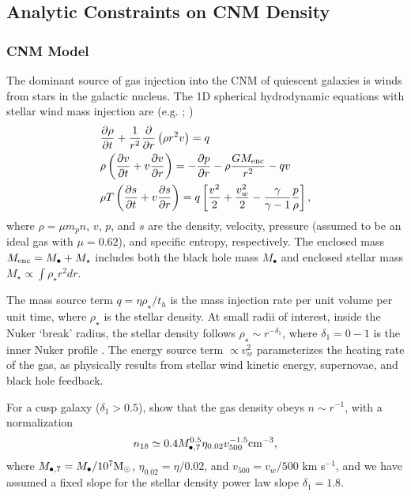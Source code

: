 \documentclass[usenatbib,fleqn]{mnras}
\newcommand{\Mbh}[1][]{M_{\bullet#1}}
\newcommand{\Menc}{M_{\rm enc}}
\renewcommand{\th}{t_h}
\newcommand{\Msun}{{\rm M_\odot}}
\begin{document}
\subsection{Analytic Constraints on CNM Density}

\subsubsection{CNM Model}

The dominant source of gas injection into the CNM of quiescent
galaxies is winds from stars in the galactic nucleus. The 1D spherical
hydrodynamic equations with stellar wind mass injection are
(e.g. \citealt{Holzer+1970}; \citealt{Quataert04}) 
\begin{align}
  &\frac{\partial \rho}{\partial t}+\frac{1}{r^2}\frac{\partial}{\partial r}\left(\rho r^2 v\right)=q \label{eq:drhodt}\\
  &\rho \left(\frac{\partial v}{\partial t} + v\frac{\partial
      v}{\partial r}\right) =-\frac{\partial p}{\partial r}- \rho\frac{GM_{\rm enc}}{r^{2}} -q v \label{eq:dvdt}\\
  &\rho T\left(\frac{\partial s}{\partial t} + v\frac{\partial
      s}{\partial
      r}\right)=q\left[\frac{v^2}{2}+\frac{v_w^2}{2}-\frac{\gamma}{\gamma-1}
    \frac{p}{\rho} \right] ,
\label{eq:dsdt}
\end{align}
where $\rho = \mu m_p n$, $v$, $p$, and $s$ are the density, velocity, pressure (assumed to be an ideal gas with $\mu = 0.62$), and
specific entropy, respectively.  The enclosed mass $\Menc = M_{\bullet} + M_{\star}$ includes both the black hole mass $M_{\bullet}$ and enclosed stellar mass $M_{\star} \propto \int \rho_{\star}r^{2}dr$.  

The mass source term $q =\eta \rho_\star/\th$ is the mass injection
rate per unit volume per unit time, where $\rho_\star$ is the stellar
density.  At small radii of interest, inside the Nuker `break' radius,
the stellar density follows $\rho_\star\sim r^{-\delta_1}$, where
$\delta_1 = 0-1$ is the inner Nuker profile \citep{Lauer+2007}.  The energy
source term $\propto v_w^{2}$ parameterizes the heating rate of the
gas, as physically results from stellar wind kinetic energy,
supernovae, and black hole feedback.

For a cusp galaxy ($\delta_1> 0.5$), \citet{Generozov+2015} show that the gas density obeys $n \sim
r^{-1}$, with a normalization
\begin{equation}
n_{18}\simeq 0.4 \Mbh[,7]^{0.5} \eta_{0.02} v_{500}^{-1.5} {\rm
  cm^{-3}},
\label{eq:n18}
\end{equation}
where $\Mbh[,7]= \Mbh/10^7 \Msun$,
$\eta_{0.02}= \eta/0.02$, and $v_{500}=v_w/500$ km s$^{-1}$, and we have assumed a fixed slope for the stellar density
power law slope $\delta_1=1.8$. 
\end{document}
